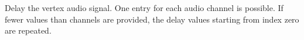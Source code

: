 Delay the vertex audio signal. One entry for each audio channel is
possible. If fewer values than channels are provided, the delay values
starting from index zero are repeated.


